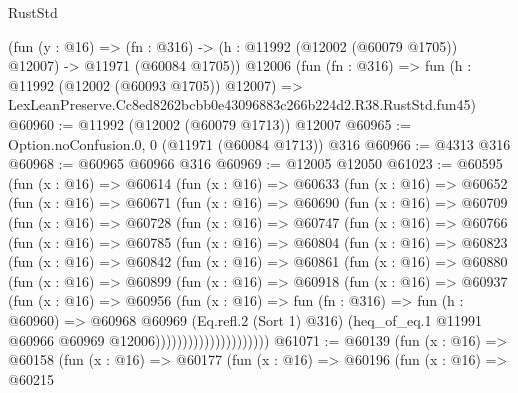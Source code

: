 \begin{lexlean}{RustStd}
\begin{coremodule}
    (fun (y : @16) =>
    (fn : @316) -> (h : @11992 (@12002 (@60079 @1705)) @12007) -> @11971 (@60084 @1705))
    @12006
    (fun (fn : @316) =>
    fun (h : @11992 (@12002 (@60093 @1705)) @12007) =>
    LexLeanPreserve.Cc8ed8262bcbb0e43096883c266b224d2.R38.RustStd.fun45)
@60960 := @11992 (@12002 (@60079 @1713)) @12007
@60965 := Option.noConfusion.{0, 0} (@11971 (@60084 @1713)) @316
@60966 := @4313 @316
@60968 := @60965 @60966 @316
@60969 := @12005 @12050
@61023 := @60595
    (fun (x : @16) =>
    @60614
      (fun (x : @16) =>
      @60633
        (fun (x : @16) =>
        @60652
          (fun (x : @16) =>
          @60671
            (fun (x : @16) =>
            @60690
              (fun (x : @16) =>
              @60709
                (fun (x : @16) =>
                @60728
                  (fun (x : @16) =>
                  @60747
                    (fun (x : @16) =>
                    @60766
                      (fun (x : @16) =>
                      @60785
                        (fun (x : @16) =>
                        @60804
                          (fun (x : @16) =>
                          @60823
                            (fun (x : @16) =>
                            @60842
                              (fun (x : @16) =>
                              @60861
                                (fun (x : @16) =>
                                @60880
                                  (fun (x : @16) =>
                                  @60899
                                    (fun (x : @16) =>
                                    @60918
                                      (fun (x : @16) =>
                                      @60937
                                        (fun (x : @16) =>
                                        @60956
                                          (fun (x : @16) =>
                                          fun (fn : @316) =>
                                          fun (h : @60960) =>
                                          @60968
                                            @60969
                                            (Eq.refl.{2} (Sort 1) @316)
                                            (heq_of_eq.{1}
                                              @11991
                                              @60966
                                              @60969
                                              @12006)))))))))))))))))))))
@61071 := @60139
    (fun (x : @16) =>
    @60158
      (fun (x : @16) =>
      @60177
        (fun (x : @16) =>
        @60196
          (fun (x : @16) =>
          @60215

\end{coremodule}
\end{lexlean}
